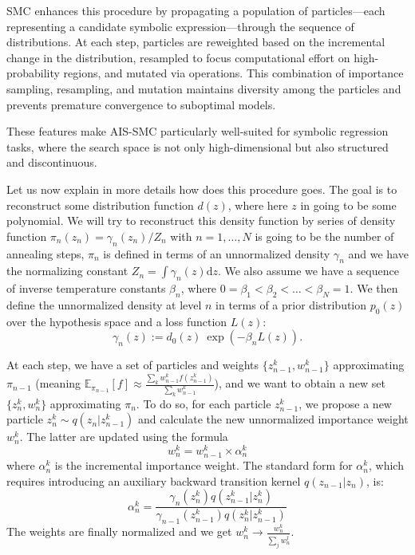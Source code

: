 \documentclass[11pt]{article}
\begin{document}
		SMC enhances this procedure by propagating a population of particles—each representing a candidate symbolic expression—through the sequence of distributions. At each step, particles are reweighted based on the incremental change in the distribution, resampled to focus computational effort on high-probability regions, and mutated via operations. This combination of importance sampling, resampling, and mutation maintains diversity among the particles and prevents premature convergence to suboptimal models.
		
		These features make AIS-SMC particularly well-suited for symbolic regression tasks, where the search space is not only high-dimensional but also structured and discontinuous. 
		
		
		Let us now explain in more details how does this procedure goes. The goal is to reconstruct some distribution function $d(z)$, where here $z$ in going to be some polynomial. We will try to reconstruct this density function by series of density function $\pi_n(z_n) = \gamma_n(z_n)/Z_n$ with $n = 1,\dots,N$ is going to be the number of annealing steps, $\pi_n$ is defined in terms of an unnormalized density $\gamma_n$ and we have the normalizing constant $Z_n = \int \gamma_n(z) \mathrm{d}z$. We also assume we have a sequence of inverse temperature constants $\beta_n$, where $0 = \beta_1 < \beta_2 <\dots< \beta_N = 1$. We then define the unnormalized density at level $n$ in terms of a prior distribution $p_0(z)$ over the hypothesis space and a loss function $L(z)$:
		\begin{equation}\label{eq:gamman}
			\gamma_n(z) := d_0(z) \: \exp \left( -\beta_n L(z) \right).
		\end{equation} 
		
		At each step, we have a set of particles and weights $\{z_{n-1}^k, w_{n-1}^k\}$ approximating $\pi_{n-1}$ (meaning $\mathbb{E}_{\pi_{n-1}}[f] \approx \frac{\sum_k w_{n-1}^k f(z_{n-1}^k)}{\sum_k w_{n-1}^k}$), and we want to obtain a new set $\{z_n^k, w_n^k\}$ approximating $\pi_n$. To do so, for each particle $z^k_{n-1}$, we propose a new particle $z_n^k \sim q(z_n | z_{n-1}^k)$ and calculate the new unnormalized importance weight $w_n^k$. The latter are updated using the formula 
		\begin{equation}
			w_n^k = w_{n-1}^k \times \alpha_{n}^k
		\end{equation}
		where $\alpha_n^k$ is the incremental importance weight. The standard form for $\alpha_n^k$, which requires introducing an auxiliary backward transition kernel $q(z_{n-1} | z_n)$, is:
		\begin{equation}
			\alpha_n^k = \frac{ \gamma_n(z_n^k) q(z_{n-1}^k | z_n^k) }{ \gamma_{n-1}(z_{n-1}^k) q(z_n^k | z_{n-1}^k) } 
		\end{equation}
		The weights are finally normalized and we get $w_n^k \rightarrow \frac{w_n^k}{\sum_j w_n^j}$.
		
\end{document}
